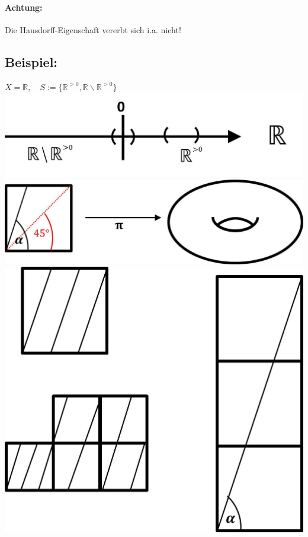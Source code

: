 \documentclass[a4paper,11pt,notitlepage]{report}
\newcommand{\R}{{\ensuremath{\mathbb{R}}}}
\newenvironment{bsp}[1]
{
\setlength{\fboxsep}{10pt}
\subsection*{Beispiel: #1}
\begin{upshape}
}
{
\end{upshape}
}
\begin{document}
\paragraph{Achtung:}
Die Hausdorff-Eigenschaft vererbt sich i.a. nicht!

\begin{bsp}{}
	$X = \R, \quad S:= \{\R^{>0}, \R \backslash \R^{>0}\}$\newline
	\includegraphics[scale=0.6]{images/Partition_R.jpg}\newline
	\includegraphics[scale=0.6]{images/Identifizierung_Linien.jpg}\newline
	\includegraphics[scale=0.6]{images/Linien_Quadrat.jpg}\newline


\end{bsp}
\end{document}
